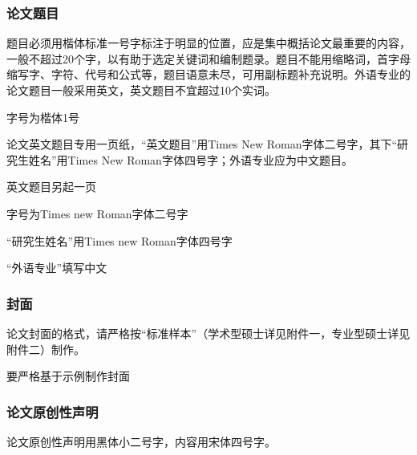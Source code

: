 \subsubsection{论文题目}

\begin{reference}
  题目必须用楷体标准一号字标注于明显的位置，应是集中概括论文最重要的内容，一般不超过20个字，以有助于选定关键词和编制题录。题目不能用缩略词，首字母缩写字、字符、代号和公式等，题目语意未尽，可用副标题补充说明。外语专业的论文题目一般采用英文，英文题目不宜超过10个实词。
\end{reference}

\begin{points}
  \item 字号为楷体1号
\end{points}


\begin{reference}
  论文英文题目专用一页纸，“英文题目”用Times New Roman字体二号字，其下“研究生姓名”用Times New Roman字体四号字；外语专业应为中文题目。
\end{reference}

\begin{points}
  \item 英文题目另起一页
  \item 字号为Times new Roman字体二号字
  \item “研究生姓名”用Times new Roman字体四号字
  \item “外语专业”填写中文
\end{points}


\subsubsection{封面}

\begin{reference}
  论文封面的格式，请严格按“标准样本”（学术型硕士详见附件一，专业型硕士详见附件二）制作。
\end{reference}

\begin{points}
  \item 要严格基于示例制作封面
\end{points}


\subsubsection{论文原创性声明}

\begin{reference}
  论文原创性声明用黑体小二号字，内容用宋体四号字。
\end{reference}


